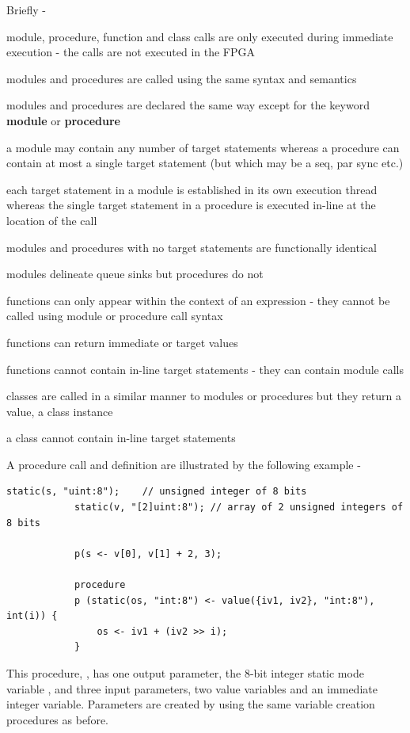         Briefly -
        \blist
        \item   module, procedure, function and class calls are only executed during
                immediate execution - the calls are not executed in the FPGA
        \item   modules and procedures are called using the same syntax and semantics
        \item   modules and procedures are declared the same way except for the
                keyword {\bf module} or {\bf procedure}
        \item   a module may contain any number of target statements whereas a
                procedure can contain at most a single target statement (but which
                may be a seq, par sync etc.)
        \item   each target statement in a module is established in its own
                execution thread whereas the single target statement in a procedure
                is executed in-line at the location of the call
        \item   modules and procedures with no target statements are functionally
                identical
        \item   modules delineate queue sinks but procedures do not
        \item   functions can only appear within the context of an expression -
                they cannot be called using module or procedure call syntax
        \item   functions can return immediate or target values
        \item   functions cannot contain in-line target statements - they can
                contain module calls
        \item   classes are called in a similar manner to modules or procedures but
                they return a value, a class instance
        \item   a class cannot contain in-line target statements
        \blend

        A procedure call and definition are illustrated by the following example -
        \begin{lstlisting}[language=threepl]
            static(s, "uint:8");    // unsigned integer of 8 bits
            static(v, "[2]uint:8"); // array of 2 unsigned integers of 8 bits

            p(s <- v[0], v[1] + 2, 3);

            procedure
            p (static(os, "int:8") <- value({iv1, iv2}, "int:8"), int(i)) {
                os <- iv1 + (iv2 >> i);
            }
        \end{lstlisting}
        This procedure, , has one output parameter, the 8-bit integer
        static mode variable , and three input parameters, two
        value variables and an immediate integer variable. Parameters are created
        by using the same variable creation procedures as before.

